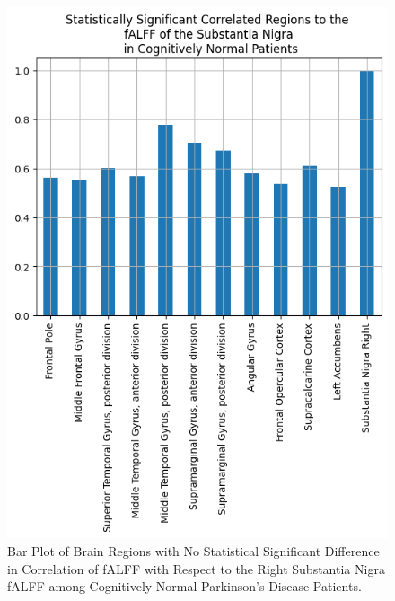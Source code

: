 \documentclass[12pt]{article}
\begin{document}
\begin{figure}[h]  %
    \centering
    \includegraphics[width=\textwidth]{"../img/statistically_significant_correlated_regions_sn_cogn.png"}  %
    \caption{Bar Plot of Brain Regions with No Statistical Significant Difference in Correlation of fALFF with Respect to the Right Substantia Nigra fALFF among Cognitively Normal Parkinson's Disease Patients.}
    \label{fig:cn}  %
\end{figure}
\end{document}
